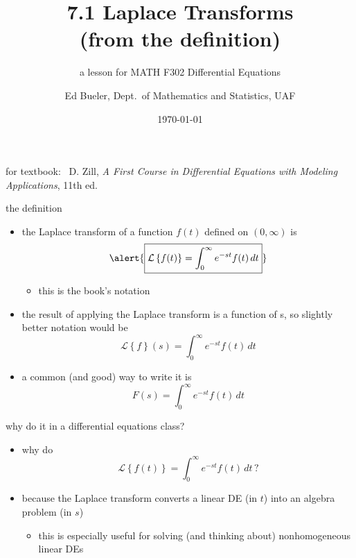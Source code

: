 \documentclass[urlcolor=blue,dvipsnames]{beamer}
\title{7.1 Laplace Transforms \\ (from the definition)}
\subtitle{a lesson for MATH F302 Differential Equations}
\author{Ed Bueler, Dept.~of Mathematics and Statistics, UAF}
\date{\tiny \today}
\begin{document}
\renewcommand{\thefootnote}{{\color{green} \arabic{footnote}}}

\begin{frame}
\titlepage

\centerline{\tiny for textbook: \, D. Zill, \emph{A First Course in Differential Equations with Modeling Applications}, 11th ed.}
\end{frame}

\newcommand{\LL}[1]{\mathcal{L}\left\{#1\right\}}

\begin{frame}{the definition}

\begin{itemize}
\item the \alert{Laplace transform} of a function $f(t)$ defined on $(0,\infty)$ is
    $$\alert{\boxed{\LL{f(t)} = \int_0^\infty e^{-st} f(t)\,dt}}$$

\vspace{-2mm}
    \begin{itemize}
    \item this is the book's notation
    \end{itemize}
\item the \alert{result} of applying the Laplace transform \alert{is a function of s}, so slightly better notation would be
    $$\LL{f}(s) = \int_0^\infty e^{-st} f(t)\,dt$$
\item a common (and good) way to write it is
    $$F(s) = \int_0^\infty e^{-st} f(t)\,dt$$
\end{itemize}
\end{frame}


\begin{frame}{why do it in a differential equations class?}

\begin{itemize}
\item why do
    $$\LL{f(t)} = \int_0^\infty e^{-st} f(t)\,dt \,?$$
\item because the Laplace transform \alert{converts a linear DE} (in $t$) \alert{into an algebra problem} (in $s$)
    \begin{itemize}
    \item this is especially useful for solving (and thinking about) nonhomogeneous linear DEs
    \end{itemize}
\end{itemize}
\end{frame}
\end{document}
